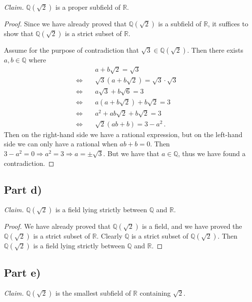 \documentclass{abrice}
\newcommand{\R}{\mathbb{R}}
\newcommand{\Q}{\mathbb{Q}}
\begin{document}
\emph{Claim.} $\Q(\sqrt 2)$ is a proper subfield of $\R$.

\begin{proof}
  Since we have already proved that $\Q(\sqrt 2)$ is a subfield of $\R$, it
  suffices to show that $\Q(\sqrt 2)$ is a strict subset of $\R$.

  Assume for the purpose of contradiction that $\sqrt{3} \in \Q(\sqrt 2)$. Then
  there exists $a,b \in \Q$ where
  \begin{align*}
    &a + b \sqrt 2 = \sqrt 3 \\ \Longleftrightarrow \quad
    &\sqrt 3(a + b \sqrt 2) = \sqrt 3 \cdot \sqrt 3 \\ \Longleftrightarrow \quad
    &a \sqrt 3 + b \sqrt 6 = 3 \\ \Longleftrightarrow \quad
    &a (a + b \sqrt 2) + b \sqrt 2 = 3 \\ \Longleftrightarrow \quad
    &a^2 + ab\sqrt 2 + b \sqrt 2 = 3 \\ \Longleftrightarrow \quad
    & \sqrt 2 (ab + b) = 3 - a^2\, .
  \end{align*}
  Then on the right-hand side we have a rational expression, but on the
  left-hand side we can only have a rational when $ab + b = 0$. Then $3 - a^2 =
  0 \Rightarrow a^2 = 3 \Rightarrow a = \pm \sqrt 3$. But we have that $a \in
  \Q$, thus we have found a contradiction.
\end{proof}

\subsection{Part d)}

\emph{Claim.} $\Q(\sqrt 2)$ is a field lying strictly between $\Q$ and $\R$.

\begin{proof}
  We have already proved that $\Q(\sqrt 2)$ is a field, and we have proved the
  $\Q(\sqrt 2)$ is a strict subset of $\R$. Clearly $\Q$ is a strict subset of
  $\Q(\sqrt 2)$. Then $\Q(\sqrt 2)$ is a field lying strictly between $\Q$ and
  $\R$.
\end{proof}

\subsection{Part e)}

\emph{Claim.} $\Q(\sqrt 2)$ is the smallest subfield of $\R$ containing $\sqrt
2$.
\end{document}
